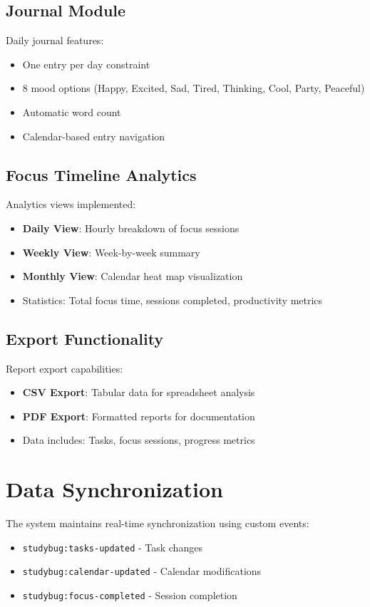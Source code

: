 \subsection{Journal Module}
Daily journal features:
\begin{itemize}
    \item One entry per day constraint
    \item 8 mood options (Happy, Excited, Sad, Tired, Thinking, Cool, Party, Peaceful)
    \item Automatic word count
    \item Calendar-based entry navigation
\end{itemize}

\subsection{Focus Timeline Analytics}
Analytics views implemented:
\begin{itemize}
    \item \textbf{Daily View}: Hourly breakdown of focus sessions
    \item \textbf{Weekly View}: Week-by-week summary
    \item \textbf{Monthly View}: Calendar heat map visualization
    \item Statistics: Total focus time, sessions completed, productivity metrics
\end{itemize}

\subsection{Export Functionality}
Report export capabilities:
\begin{itemize}
    \item \textbf{CSV Export}: Tabular data for spreadsheet analysis
    \item \textbf{PDF Export}: Formatted reports for documentation
    \item Data includes: Tasks, focus sessions, progress metrics
\end{itemize}

\section{Data Synchronization}
The system maintains real-time synchronization using custom events:

\begin{itemize}
    \item \texttt{studybug:tasks-updated} - Task changes
    \item \texttt{studybug:calendar-updated} - Calendar modifications
    \item \texttt{studybug:focus-completed} - Session completion
\end{itemize}

